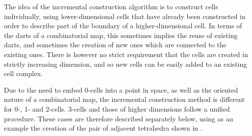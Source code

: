 The idea of the incremental construction algorithm is to construct cells individually, using lower-dimensional cells that have already been constructed in order to describe part of the boundary of a higher-dimensional cell.
In terms of the darts of a combinatorial map, this sometimes implies the reuse of existing darts, and sometimes the creation of new ones which are connected to the existing ones.
There is however no strict requirement that the cells are created in strictly increasing dimension, and so new cells can be easily added to an existing cell complex.

Due to the need to embed 0-cells into a point in space, as well as the oriented nature of a combinatorial map, the incremental construction method is different for 0-, 1- and 2-cells.
3-cells and those of higher dimensions follow a unified procedure.
These cases are therefore described separately below, using as an example the creation of the pair of adjacent tetrahedra shown in .
